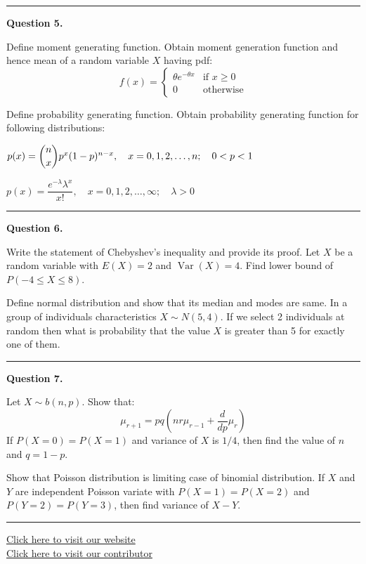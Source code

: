 \documentclass[11pt,a4paper]{article}
\begin{document}
\medskip\rule{\linewidth}{0.2pt}\medskip




\noindent   \textbf{Question 5.}

\begin{parts}
  \item Define moment generating function. Obtain moment generation function and hence mean of a random variable $X$ having pdf:
  \[ f(x) = 
\begin{cases}  \theta e^{- \theta x} &  \text{if } x \ge 0 \\ 0 &  \text{otherwise} \end{cases} \]

  \item Define probability generating function. Obtain probability generating function for following distributions:
  
\begin{parts}
    \item $p(x) = \dbinom{n}{x} p^x (1-p)^{n-x}, \quad x = 0, 1, 2, \dots, n; \quad 0 < p < 1$
    \item $p(x) = \dfrac{e^{-\lambda} \lambda^x}{x!}, \quad x = 0, 1, 2, \dots, \infty; \quad \lambda > 0$
  \end{parts}
\end{parts}

\medskip\rule{\linewidth}{0.2pt}\medskip




\noindent   \textbf{Question 6.}

\begin{parts}
  \item Write the statement of Chebyshev's inequality and provide its proof. Let $X$ be a random variable with $E(X) = 2$ and $\operatorname{Var}(X) = 4$. Find lower bound of $P(-4 \le X \le 8)$.

  \item Define normal distribution and show that its median and modes are same. In a group of individuals characteristics $X \sim N(5, 4)$. If we select 2 individuals at random then what is probability that the value $X$ is greater than 5 for exactly one of them.
\end{parts}

\medskip\rule{\linewidth}{0.2pt}\medskip




\noindent   \textbf{Question 7.}

\begin{parts}
  \item Let $X \sim b(n, p)$. Show that:
  \[ \mu_{r+1} = pq \left( n r \mu_{r-1} + \frac{d}{dp}\mu_r \right) \]
  If $P(X = 0) = P(X = 1)$ and variance of $X$ is $1/4$, then find the value of $n$ and $q = 1 - p$.

  \item Show that Poisson distribution is limiting case of binomial distribution. If $X$ and $Y$ are independent Poisson variate with $P(X=1) = P(X=2)$ and $P(Y=2) = P(Y=3)$, then find variance of $X - Y$.
\end{parts}

\vfill
\rule{\linewidth}{0.4pt}

\begin{center}\small
\href{https://bhu-exam.vercel.app/}{Click here to visit our website}\\[4pt]
\href{https://me-aryan.vercel.app/}{Click here to visit our contributor}
\end{center}
\end{document}
